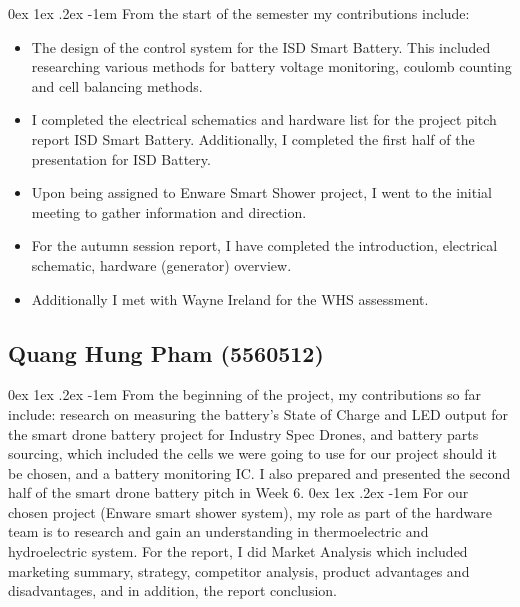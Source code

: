 \documentclass[12pt, a4paper]{article}
\makeatletter
\renewcommand\paragraph{\@startsection{paragraph}{5}{\parindent}%
  {0ex \@plus1ex \@minus.2ex}%
  {-1em}%
  {\normalfont\normalsize\bfseries}}
\makeatother
\begin{document}
                \paragraph{}
                    From the start of the semester my contributions include:
                    \begin{itemize}
                        \item The design of the control system for the ISD Smart Battery. This included researching various methods for battery voltage monitoring, 
                        coulomb counting and cell balancing methods.
                        \item I completed the electrical schematics and hardware list for the project pitch report ISD Smart Battery. Additionally, I completed the 
                        first half of the presentation for ISD Battery.
                        \item Upon being assigned to Enware Smart Shower project, I went to the initial meeting to gather information and direction. 
                        \item For the autumn session report, I have completed the introduction, electrical schematic, hardware (generator) overview.
                        \item Additionally I met with Wayne Ireland for the WHS assessment.
                    \end{itemize}
            \subsection{Quang Hung Pham (5560512)}
                \paragraph{}
                    From the beginning of the project, my contributions so far include: research on measuring the battery’s State of Charge and LED output for the 
                    smart drone battery project for Industry Spec Drones, and battery parts sourcing, which included the cells we were going to use for our project 
                    should it be chosen, and a battery monitoring IC. I also prepared and presented the second half of the smart drone battery pitch in Week 6.
                \paragraph{}
                    For our chosen project (Enware smart shower system), my role as part of the hardware team is to research and gain an understanding in thermoelectric 
                    and hydroelectric system. For the report, I did Market Analysis which included marketing summary, strategy, competitor analysis, product advantages 
                    and disadvantages, and in addition, the report conclusion.
\end{document}
